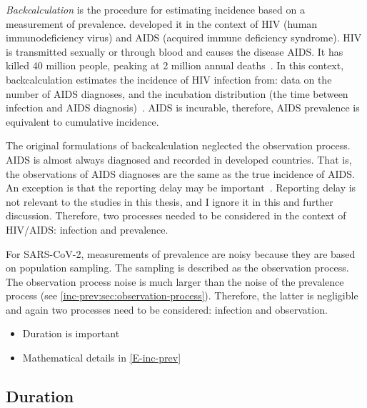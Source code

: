 \documentclass[thesis.tex]{subfiles}
\begin{document}
\emph{Backcalculation} is the procedure for estimating incidence based on a measurement of prevalence.
\Textcite{brookmeyerMethod} developed it in the context of HIV (human immunodeficiency virus) and AIDS (acquired immune deficiency syndrome).
HIV is transmitted sexually or through blood and causes the disease AIDS.
It has killed 40 million people, peaking at 2 million annual deaths~\autocite{unaids2023}.
In this context, backcalculation estimates the incidence of HIV infection from: data on the number of AIDS diagnoses, and the incubation distribution (the time between infection and AIDS diagnosis)~\autocites{brookmeyerBackcalculation}{brookmeyerMeasuring}.
AIDS is incurable, therefore, AIDS prevalence is equivalent to cumulative incidence.


The original formulations of backcalculation neglected the observation process.
AIDS is almost always diagnosed and recorded in developed countries.
That is, the observations of AIDS diagnoses are the same as the true incidence of AIDS.
An exception is that the reporting delay may be important~\autocite{paganoHIV}.
Reporting delay is not relevant to the studies in this thesis, and I ignore it in this and further discussion.
Therefore, two processes needed to be considered in the context of HIV/AIDS: infection and prevalence.

For SARS-CoV-2, measurements of prevalence are noisy because they are based on population sampling.
The sampling is described as the observation process.
The observation process noise is much larger than the noise of the prevalence process (see \cref{inc-prev:sec:observation-process}).
Therefore, the latter is negligible and again two processes need to be considered: infection and observation.

\begin{itemize}
    \item Duration is important
    \item Mathematical details in \cref{E-inc-prev}
\end{itemize}

\subsection{Duration} \label{inc-prev:sec:duration}
\end{document}
